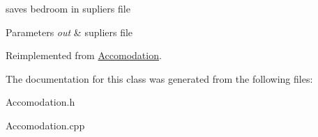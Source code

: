 saves bedroom in supliers file 


\begin{DoxyParams}{Parameters}
{\em out} & supliers file \\
\hline
\end{DoxyParams}


Reimplemented from \hyperlink{class_accomodation_a4394eb907b2d5a23faf73dd03c1dac4d}{Accomodation}.



The documentation for this class was generated from the following files\+:\begin{DoxyCompactItemize}
\item 
Accomodation.\+h\item 
Accomodation.\+cpp\end{DoxyCompactItemize}
